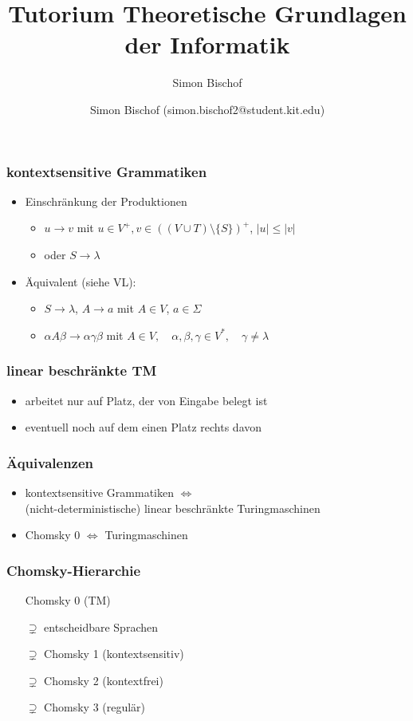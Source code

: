 \documentclass{beamer}
\author{Simon Bischof (simon.bischof2@student.kit.edu)}
\title{Tutorium Theoretische Grundlagen der Informatik}
\subtitle{Simon Bischof}
\institute{Institut f\"{u}r Kryptographie und Sicherheit}
\begin{document}
\begin{frame}
\maketitle
\end{frame}

\begin{frame}
\frametitle{kontextsensitive Grammatiken}
\begin{itemize}
\item Einschränkung der Produktionen
\begin{itemize}
\item $u\to v$ mit $u\in V^+, v\in \left((V\cup T)\setminus \{S\}\right)^+$, $|u|\leq|v|$
\item oder $S\to\lambda$
\end{itemize} \pause
\item Äquivalent (siehe VL):
\begin{itemize}
\item $S\to\lambda$, $A\to a$ mit $A\in V$, $a\in\Sigma$
\item $\alpha A\beta\to\alpha\gamma\beta$ mit $A\in V,\quad \alpha,\beta,\gamma\in V^*,\quad \gamma\neq\lambda$
\end{itemize}
\end{itemize}
\end{frame}

\begin{frame}
\frametitle{linear beschränkte TM}
\begin{itemize}
\item arbeitet nur auf Platz, der von Eingabe belegt ist
\item eventuell noch auf dem einen Platz rechts davon
\end{itemize}
\end{frame}

\begin{frame}
\frametitle{Äquivalenzen}
\begin{itemize}
\item kontextsensitive Grammatiken $\Leftrightarrow$ \\(nicht-deterministische) linear beschränkte Turingmaschinen
\item Chomsky 0 $\Leftrightarrow$ Turingmaschinen
\end{itemize}
\end{frame}

\begin{frame}
\frametitle{Chomsky-Hierarchie}
\begin{itemize}
\item[] Chomsky 0 (TM)
\item[$\supsetneq$] entscheidbare Sprachen
\item[$\supsetneq$] Chomsky 1 (kontextsensitiv)
\item[$\supsetneq$] Chomsky 2 (kontextfrei)
\item[$\supsetneq$] Chomsky 3 (regulär)
\end{itemize}
\end{frame}
\end{document}
